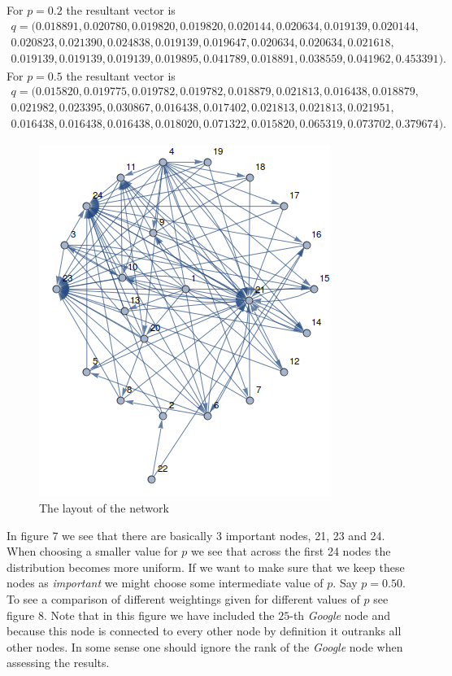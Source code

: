 \documentclass{unswmaths}
\begin{document}
For $ p = 0.2 $ the resultant vector is
\begin{align*}
    q = (
   0.018891,
   0.020780,
   0.019820,
   0.019820,
   0.020144,
   0.020634,
   0.019139,
   0.020144, \\
   0.020823,
   0.021390,
   0.024838,
   0.019139,
   0.019647,
   0.020634,
   0.020634,
   0.021618, \\
   0.019139,
   0.019139,
   0.019139,
   0.019895,
   0.041789,
   0.018891,
   0.038559,
   0.041962,
   0.453391 
).
\end{align*}
For $ p = 0.5 $ the resultant vector is
\begin{align*}
    q = (
   0.015820,
   0.019775,
   0.019782,
   0.019782,
   0.018879,
   0.021813,
   0.016438,
   0.018879, \\
   0.021982,
   0.023395,
   0.030867,
   0.016438,
   0.017402,
   0.021813,
   0.021813,
   0.021951, \\
   0.016438,
   0.016438,
   0.016438,
   0.018020,
   0.071322,
   0.015820,
   0.065319,
   0.073702,
   0.379674 
).
\end{align*}
\begin{figure}[h]
    \includegraphics[scale=0.8]{Graph}
    \caption{The layout of the network}
\end{figure}
In figure 7 we see that there are basically 3 important nodes, 21, 23 and 24. When choosing a smaller value for $ p $  we see that across the first 24 nodes the distribution becomes more uniform. If we want to make sure that we keep these nodes as \emph{important} we might choose some intermediate value of $ p $. Say $ p = 0.50 $.
To see a comparison of different weightings given for different values of $ p $ see figure 8. Note that in this figure we have included the $25$-th \emph{Google} node and because this node is connected to every other node by definition it outranks all other nodes. In some sense one should ignore the rank of the \emph{Google} node when assessing the results.
\end{document}
